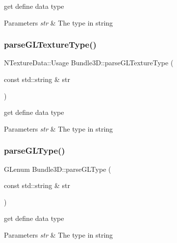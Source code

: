 get define data type 
\begin{DoxyParams}{Parameters}
{\em str} & The type in string \\
\hline
\end{DoxyParams}
\mbox{\label{classBundle3D_a467d6b0c572920193acd43365a7300d2}} 
\subsubsection{\texorpdfstring{parse\+G\+L\+Texture\+Type()}{parseGLTextureType()}\hspace{0.1cm}{\footnotesize\ttfamily [2/2]}}
{\footnotesize\ttfamily N\+Texture\+Data\+::\+Usage Bundle3\+D\+::parse\+G\+L\+Texture\+Type (\begin{DoxyParamCaption}\item[{const std\+::string \&}]{str }\end{DoxyParamCaption})\hspace{0.3cm}{\ttfamily [protected]}}

get define data type 
\begin{DoxyParams}{Parameters}
{\em str} & The type in string \\
\hline
\end{DoxyParams}
\mbox{\label{classBundle3D_ada1b94dfaf386bba7c8014a2678da5fb}} 
\subsubsection{\texorpdfstring{parse\+G\+L\+Type()}{parseGLType()}\hspace{0.1cm}{\footnotesize\ttfamily [1/2]}}
{\footnotesize\ttfamily G\+Lenum Bundle3\+D\+::parse\+G\+L\+Type (\begin{DoxyParamCaption}\item[{const std\+::string \&}]{str }\end{DoxyParamCaption})\hspace{0.3cm}{\ttfamily [protected]}}

get define data type 
\begin{DoxyParams}{Parameters}
{\em str} & The type in string \\
\hline
\end{DoxyParams}
\mbox{\label{classBundle3D_ada1b94dfaf386bba7c8014a2678da5fb}} 

